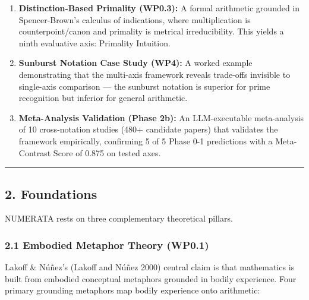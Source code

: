 \documentclass[
]{article}
\providecommand{\tightlist}{%
  \setlength{\itemsep}{0pt}\setlength{\parskip}{0pt}}
\begin{document}
\begin{enumerate}
\def\labelenumi{\arabic{enumi}.}
\tightlist
\item
  \textbf{Distinction-Based Primality (WP0.3):} A formal arithmetic
  grounded in Spencer-Brown's calculus of indications, where
  multiplication is counterpoint/canon and primality is metrical
  irreducibility. This yields a ninth evaluative axis: Primality
  Intuition.
\item
  \textbf{Sunburst Notation Case Study (WP4):} A worked example
  demonstrating that the multi-axis framework reveals trade-offs
  invisible to single-axis comparison --- the sunburst notation is
  superior for prime recognition but inferior for general arithmetic.
\item
  \textbf{Meta-Analysis Validation (Phase 2b):} An LLM-executable
  meta-analysis of 10 cross-notation studies (480+ candidate papers)
  that validates the framework empirically, confirming 5 of 5 Phase 0-1
  predictions with a Meta-Contrast Score of 0.875 on tested axes.
\end{enumerate}

\begin{center}\rule{0.5\linewidth}{0.5pt}\end{center}

\subsection{2. Foundations}\label{foundations}

NUMERATA rests on three complementary theoretical pillars.

\subsubsection{2.1 Embodied Metaphor Theory
(WP0.1)}\label{embodied-metaphor-theory-wp0.1}

Lakoff \& Núñez's (Lakoff and Núñez 2000) central claim is that
mathematics is built from embodied conceptual metaphors grounded in
bodily experience. Four primary grounding metaphors map bodily
experience onto arithmetic:
\end{document}
